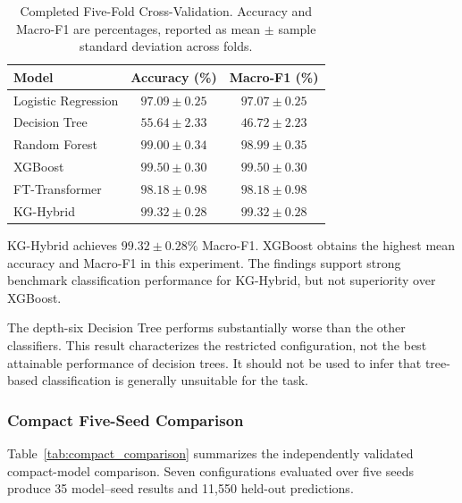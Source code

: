\begin{table}[t]
\centering
\caption{Completed Five-Fold Cross-Validation.
Accuracy and Macro-F1 are percentages, reported as mean
$\pm$ sample standard deviation across folds.}
\label{tab:baseline_comparison}
\small
\begin{tabular}{lcc}
\hline
Model & Accuracy (\%) & Macro-F1 (\%) \\
\hline
Logistic Regression & $97.09\pm0.25$ & $97.07\pm0.25$ \\
Decision Tree       & $55.64\pm2.33$ & $46.72\pm2.23$ \\
Random Forest       & $99.00\pm0.34$ & $98.99\pm0.35$ \\
XGBoost             & $99.50\pm0.30$ & $99.50\pm0.30$ \\
FT-Transformer      & $98.18\pm0.98$ & $98.18\pm0.98$ \\
KG-Hybrid           & $99.32\pm0.28$ & $99.32\pm0.28$ \\
\hline
\end{tabular}
\end{table}

KG-Hybrid achieves $99.32\pm0.28\%$ Macro-F1.
XGBoost obtains the highest mean accuracy and Macro-F1 in this
experiment. The findings support strong benchmark classification
performance for KG-Hybrid, but not superiority over XGBoost.

The depth-six Decision Tree performs substantially worse than the
other classifiers. This result characterizes the restricted
configuration, not the best attainable performance of decision trees.
It should not be used to infer that tree-based classification is
generally unsuitable for the task.

\subsubsection{Compact Five-Seed Comparison}

Table~\ref{tab:compact_comparison} summarizes the independently
validated compact-model comparison. Seven configurations evaluated
over five seeds produce 35 model--seed results and 11,550 held-out
predictions.

